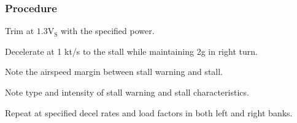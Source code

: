 % 
% 
%
 \subsubsection*{Procedure}
 \begin{compactenum}
   \item Trim at $\mathrm{1.3V_{S}}$ with the specified power.
   \item Decelerate at 1 kt/s to the stall while maintaining 2g in right turn.
   \item Note the airspeed margin between stall warning and stall.
   \item Note type and intensity of stall warning and stall characteristics.
   \item Repeat at specified decel rates and load factors in both left and right banks.
   \end{compactenum}
